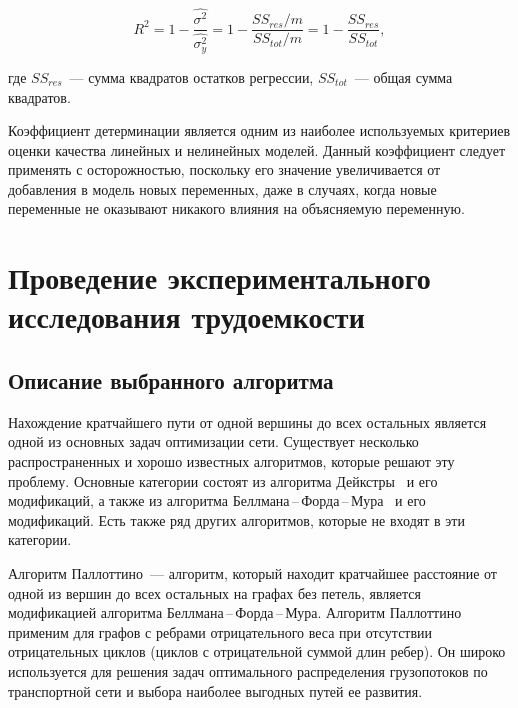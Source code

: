 \documentclass[a4paper, article, 14pt]{extarticle}
\begin{document}
\begin{equation}\label{eq:coefficient_of_determination}
	R^2 = 1 - \frac{\widehat{\sigma^2}}{\widehat{\sigma_y^2}} = 1 - \frac{SS_{res} / m}{SS_{tot} / m} = 1 - \frac{SS_{res}}{SS_{tot}},
\end{equation}

\noindent где $SS_{res}$~--- сумма квадратов остатков регрессии, $SS_{tot}$~--- общая сумма квадратов.

Коэффициент детерминации является одним из наиболее используемых критериев оценки качества линейных и нелинейных моделей. Данный коэффициент следует применять с осторожностью, поскольку его значение увеличивается от добавления в модель новых переменных, даже в случаях, когда новые переменные не оказывают никакого влияния на объясняемую переменную.


\section{Проведение экспериментального исследования трудоемкости}\label{sec:practical_complexity_research}

\subsection{Описание выбранного алгоритма}\label{sec:pallotino_algorithm}

Нахождение кратчайшего пути от одной вершины до всех остальных является одной из основных задач оптимизации сети. Существует несколько распространенных и хорошо известных алгоритмов, которые решают эту проблему. Основные категории состоят из алгоритма Дейкстры~\cite{dijkstra} и его модификаций, а также из алгоритма Беллмана\,--\,Форда\,--\,Мура~\cite{bellman, ford, moore} и его модификаций. Есть также ряд других алгоритмов, которые не входят в эти категории.

Алгоритм Паллоттино~--- алгоритм, который находит кратчайшее расстояние от одной из вершин до всех остальных на графах без петель, является модификацией алгоритма Беллмана\,--\,Форда\,--\,Мура. Алгоритм Паллоттино применим для графов с ребрами отрицательного веса при отсутствии отрицательных циклов (циклов с отрицательной суммой длин ребер). Он широко используется для решения задач оптимального распределения грузопотоков по транспортной сети и выбора наиболее выгодных путей ее развития.
\end{document}
